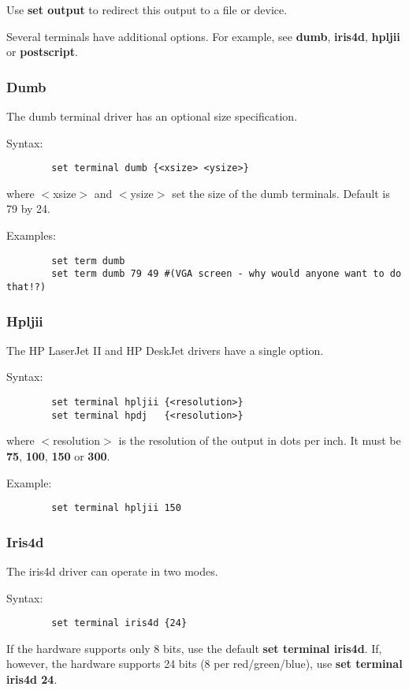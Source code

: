 Use {\bf set output} to redirect this output to a file or device.

Several terminals have additional options. For example, see {\bf dumb},
{\bf iris4d}, {\bf hpljii} or {\bf postscript}.
\subsubsection{Dumb}
The dumb terminal driver has an optional size specification.

Syntax:
\begin{verbatim}
        set terminal dumb {<xsize> <ysize>}
\end{verbatim}

where $<$xsize$>$ and $<$ysize$>$ set the size of the dumb terminals. Default
is 79 by 24.

Examples:
\begin{verbatim}
        set term dumb
        set term dumb 79 49 #(VGA screen - why would anyone want to do that!?)
\end{verbatim}

\subsubsection{Hpljii}
The HP LaserJet II and HP DeskJet drivers have a single option.

Syntax:
\begin{verbatim}
        set terminal hpljii {<resolution>}
        set terminal hpdj   {<resolution>}
\end{verbatim}

where $<$resolution$>$ is the resolution of the output in dots per inch.
It must be {\bf 75}, {\bf 100}, {\bf 150} or {\bf 300}.

Example:
\begin{verbatim}
        set terminal hpljii 150
\end{verbatim}

\subsubsection{Iris4d}
The iris4d driver can operate in two modes.

Syntax:
\begin{verbatim}
        set terminal iris4d {24}
\end{verbatim}

If the hardware supports only 8 bits, use the default {\bf set terminal
iris4d}. If, however, the hardware supports 24 bits (8 per
red/green/blue), use {\bf set terminal iris4d 24}.

